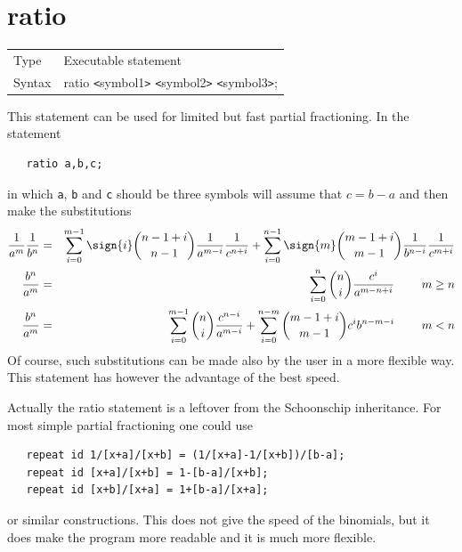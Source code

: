  
\section{ratio}
\label{substaratio}

\noindent \begin{tabular}{ll}
Type & Executable statement\\
Syntax & ratio {\tt<}symbol1{\tt>} {\tt<}symbol2{\tt>} {\tt<}symbol3{\tt>};
\end{tabular} \vspace{4mm}

\noindent This statement can be used for limited but fast 
partial fractioning. In the statement
\begin{verbatim}
   ratio a,b,c;
\end{verbatim}
in which \verb:a:, \verb:b: and \verb:c: should be three symbols {\FORM} 
will assume that $c = b-a$ and then make the substitutions
\begin{eqnarray}
    \frac{1}{a^m}\frac{1}{b^n} & = & \sum_{i=0}^{m-1}\sign{i}
        \binom{n-1+i}{n-1}\frac{1}{a^{m-i}}\frac{1}{c^{n+i}}
        +\sum_{i=0}^{n-1}\sign{m}
        \binom{m-1+i}{m-1}\frac{1}{b^{n-i}}\frac{1}{c^{m+i}}
        \nonumber \\
    \frac{b^n}{a^m} & = & \sum_{i=0}^n\binom{n}{i}\frac{c^i}{a^{m-n+i}}
            \ \ \ \ \ \ \ \hfill m\ge n \nonumber \\
    \frac{b^n}{a^m} & = & \sum_{i=0}^{m-1}\binom{n}{i}\frac{c^{n-i}}{a^{m-i}}
        + \sum_{i=0}^{n-m}\binom{m-1+i}{m-1}
            c^ib^{n-m-i}
            \ \ \ \ \ \ \ \hfill m<n \nonumber
\end{eqnarray}
Of course, such substitutions can be made also by the user in a more 
flexible way. This statement has however the advantage of the best speed.
\vspace{4mm}

\noindent Actually the ratio statement is a leftover from the 
Schoonschip 
inheritance. For most simple partial fractioning one could use
\begin{verbatim}
   repeat id 1/[x+a]/[x+b] = (1/[x+a]-1/[x+b])/[b-a];
   repeat id [x+a]/[x+b] = 1-[b-a]/[x+b];
   repeat id [x+b]/[x+a] = 1+[b-a]/[x+a];
\end{verbatim}
or similar constructions. This does not give the speed of the 
binomials, but it does make the program more readable and 
it is much more flexible.
\vspace{10mm}


